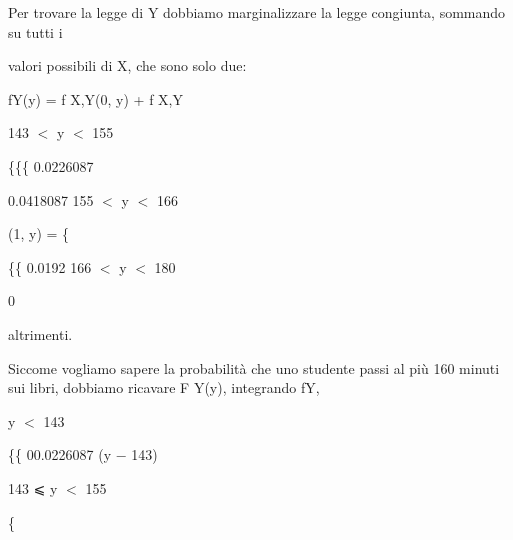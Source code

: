 \documentclass[a4paper,portrait,12pt]{article}
\begin{document}
\begin{flushleft}
Per trovare la legge di Y dobbiamo marginalizzare la legge congiunta, sommando su tutti i
\end{flushleft}


\begin{flushleft}
valori possibili di X, che sono solo due:
\end{flushleft}


\begin{flushleft}
fY(y) = f X,Y(0, y) + f X,Y
\end{flushleft}





\begin{flushleft}
143 $<$ y $<$ 155
\end{flushleft}


\{\{\{ 0.0226087


\begin{flushleft}
0.0418087 155 $<$ y $<$ 166
\end{flushleft}


\begin{flushleft}
(1, y) = \{
\end{flushleft}


\begin{flushleft}
\{\{ 0.0192 166 $<$ y $<$ 180
\end{flushleft}


0


\begin{flushleft}
altrimenti.
\end{flushleft}





\begin{flushleft}
Siccome vogliamo sapere la probabilit\`{a} che uno studente passi al più 160 minuti sui libri, dobbiamo ricavare F Y(y), integrando fY,
\end{flushleft}


\begin{flushleft}
y $<$ 143
\end{flushleft}


\begin{flushleft}
\{\{ 00.0226087 (y $-$ 143)
\end{flushleft}


\begin{flushleft}
143 ⩽ y $<$ 155
\end{flushleft}


\{
\end{document}
